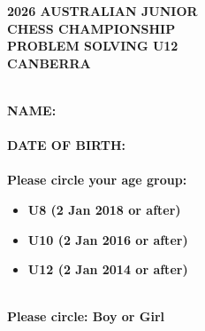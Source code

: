 \documentclass[14pt]{article}
\begin{document}
\begin{titlepage}
\thispagestyle{fancy}


\begin{center}
\vspace{20mm}
\textbf{\Huge 2026 AUSTRALIAN JUNIOR}\\
\vspace{6mm}
\textbf{\Huge CHESS CHAMPIONSHIP}\\
\vspace{6mm}
\textbf{\Huge PROBLEM SOLVING U12}\\
\vspace{6mm}
\textbf{\Huge CANBERRA}\\
\end{center}

\vspace{8mm}\\
\textbf{\LARGE NAME: \hspace{3mm} \underline{\hspace{8cm}}}\\
\vspace{5mm}\\
\textbf{\LARGE DATE OF BIRTH: \hspace{3mm} \underline{\hspace{5cm}}}\\
\vspace{5mm}\\

\textbf{\LARGE Please circle your age group:}\\
\begin{itemize}
  \item \textbf{\Large  U8 (2 Jan 2018 or after)}
  \item \textbf{\Large  U10 (2 Jan 2016 or after)}
  \item \textbf{\Large  U12 (2 Jan 2014 or after)}
\end{itemize}
\vspace{5mm}\\

\textbf{\LARGE Please circle: Boy or Girl}\\
\vspace{5mm}\\


\end{titlepage}
\end{document}
